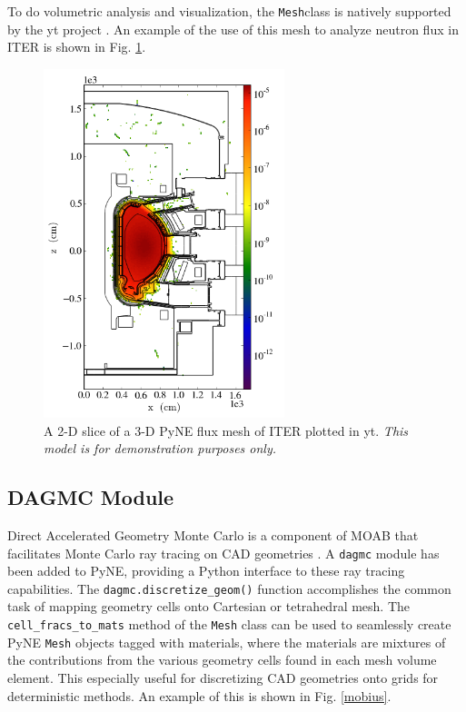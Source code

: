 \documentclass{anstrans}
\newcommand{\Mesh}{\texttt{Mesh}}
\begin{document}
To do volumetric analysis and visualization, the \Mesh class is natively supported 
by the yt project \cite{2011ApJS..192....9T}. An example of the use of this mesh
to analyze neutron flux in ITER is shown in Fig. \ref{ITER}.

\begin{figure}
    \centering
    \includegraphics[width=7.0cm, angle =0]{flux_slice.png}
    \caption{A 2-D slice of a 3-D PyNE flux mesh of ITER plotted in yt. \textit{This model is for demonstration
           purposes only.}}
    \label{ITER}
\end{figure}


\subsection{DAGMC Module}

Direct Accelerated Geometry Monte Carlo is a component of MOAB that
facilitates Monte Carlo ray tracing on CAD geometries
\cite{tautges_acceleration_2009}.  A \texttt{dagmc} module has been added to
PyNE, providing a Python interface to these ray tracing capabilities. The
\texttt{dagmc.discretize\_geom()} function accomplishes the common task of
mapping geometry cells onto Cartesian or tetrahedral mesh. The
\texttt{cell\_fracs\_to\_mats} method of the \texttt{Mesh} class can be used
to seamlessly create PyNE \texttt{Mesh} objects tagged with materials, where
the materials are mixtures of the contributions from the various geometry cells
found in each mesh volume element. This especially useful for discretizing CAD
geometries onto grids for deterministic methods. An example of this is shown in
Fig. \ref{mobius}.
\end{document}
